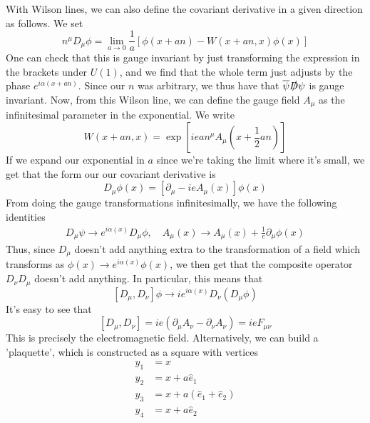 \documentclass[11pt, oneside]{article}   	%
\theoremstyle{slanted}
\begin{document}
With Wilson lines, we can also define 
the covariant derivative in a given direction as 
follows.
We set 
\[
 n ^ \mu D _ \mu \phi  = \lim_{ a \to 0  } \frac{1}{ a } 
 \left[  \phi \left( x + an  \right)   - W \left( x + an, x  \right) \phi \left(  x  \right) \right] 
\] One can check that this is 
gauge invariant by just transforming the 
expression in the brackets under $ U \left(  1  \right) $, 
and we find that the whole term just adjusts by the 
phase $ e ^{ i \alpha \left(  x+ an   \right)  } $. 
Since our $ n   $ was arbitrary, we thus have 
that $ \overline{ \psi  }\slashed{D}\psi   $
is gauge invariant. Now, from this Wilson line, we
can define the gauge field $ A _ \mu $ as the infinitesimal 
parameter in the exponential. 
We write 
\[
	W \left(  x + an , x  \right)  = \exp \left[ ie a n ^ \mu A _\mu \left( 
	x + \frac{1}{2   } an \right)    \right] 
\]   If we expand our exponential in $  a $ since 
we're taking the limit where it's small, we 
get that the form our our covariant derivative is 
\[
	D_ \mu \phi \left(  x  \right)   = \left[  \partial  _ \mu  - i eA _ \mu \left(  x  \right)    \right] 
	\phi \left(  x  \right)  
\] From doing the gauge transformations 
infinitesimally, we have the following identities
\begin{align*}
	D _ \mu \psi \to e ^{ i \alpha \left(  x  \right)  } D _ \mu \phi , 
	\quad A _ \mu \left(  x  \right)  \to A_ \mu \left(  x  \right)   + \frac{1}{ e } \partial  _ \mu 
	\phi \left(  x  \right) 
\end{align*}
Thus, since $ D _ \mu  $  doesn't add anything 
extra to the transformation of a field 
which transforms as $ \phi \left(  x  \right)  \to e ^{ i \alpha \left( x   \right) } \phi \left(  x  \right)$, 
we then get that the composite operator $ D _ \nu D _ \mu $  
doesn't add anything. 
In particular, this means that 
\[
	\left[  D _ \mu , D _ \nu   \right]  \phi \to ie ^{ i \alpha \left(  x  \right)  } 
	D_\nu \left( D _ \mu \phi  \right)  
\] It's easy to see that 
\[
	\left[  D _ \mu , D _ \nu   \right]  = i e\left( \partial  _ \mu 
	A _ \nu  - \partial  _ \nu A _ \nu  \right)   = ie F _{ \mu \nu } 
\] This is precisely 
the electromagnetic field. 
Alternatively, 
we can build a 'plaquette', 
which is constructed as a square with vertices
\begin{align*}
	y_1  &=  x  \\ 
	y_2  &= x + a \hat{ e } _ 1  \\
	y_3 &=  x + a \left( \hat{ e  } _ 1 + \hat{ e  }_ 2   \right)   \\ 
	y_ 4 &=  x + a \hat{ e } _ 2   \\ 
\end{align*}
\end{document}
